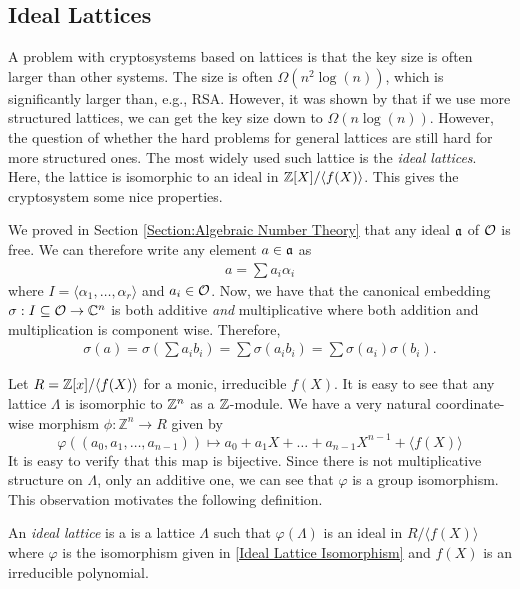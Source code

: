 \subsection{Ideal Lattices}
    A problem with cryptosystems based on lattices is that the key size is often larger than other systems. The size is often \(\Omega(n^2\log(n))\), which is significantly larger than, e.g., RSA. However, it was shown by \cite[p.~2]{Estimate Security}  that if we use more structured lattices, we can get the key size down to \(\Omega(n\log(n))\). However, the question of whether the hard problems for general lattices are still hard for more structured ones. The most widely used such lattice is the \emph{ideal lattices}. Here, the lattice is isomorphic to an ideal in \(\mathbb{Z}[X]/\langle f(X)\rangle\). This gives the cryptosystem some nice properties.\par
    
    We proved in Section \ref{Section:Algebraic Number Theory} that any ideal \(\mathfrak{a}\) of \(\mathcal{O}\) is free. We can therefore write any element \(a\in\mathfrak{a}\) as
    \begin{align*}
        a = \sum a_i\alpha_i
    \end{align*}
    where \(I = \langle\alpha_1 , \dots , \alpha_r\rangle\) and \(a_i\in\mathcal{O}\). Now, we have that the canonical embedding \(\sigma:I\subseteq\mathcal{O}\rightarrow\mathbb{C}^n\) is both additive \emph{and} multiplicative where both addition and multiplication is component wise. Therefore,
    \begin{align*}
        \sigma(a) = \sigma\left(\sum a_i b_i\right) = \sum\sigma(a_i b_i) = \sum\sigma(a_i)\sigma(b_i).
    \end{align*}
    
    \par
    Let \(R = \mathbb{Z}[x]/\langle f(X)\rangle \) for a monic, irreducible \(f(X)\). It is easy to see that any lattice \(\Lambda\) is isomorphic to \(\mathbb{Z}^n\) as a \(\mathbb{Z}\)-module. We have a very natural coordinate-wise morphism \(\phi:\mathbb{Z}^n \rightarrow R\) given by
    \begin{equation}
    \label{Ideal Lattice Isomorphism}
        \varphi((a_0, a_1, \dots , a_{n-1})) \mapsto a_0 + a_1X + \dots + a_{n-1}X^{n-1} + \langle f(X)\rangle
    \end{equation}
    It is easy to verify that this map is bijective. Since there is not multiplicative structure on \(\Lambda\), only an additive one, we can see that \(\varphi\) is a group isomorphism. This observation motivates the following definition. 
    \begin{definition}
        An \emph{ideal lattice} is a is a lattice \(\Lambda\) such that  \(\varphi(\Lambda)\) is an ideal in \(R/\langle f(X)\rangle\) where \(\varphi\) is the isomorphism given in \eqref{Ideal Lattice Isomorphism} and \(f(X)\) is an irreducible polynomial.
    \end{definition}
    
